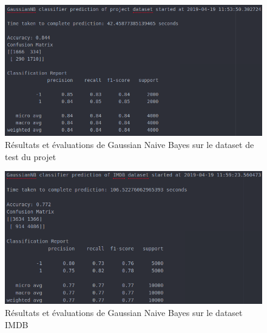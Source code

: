 \documentclass[12pt,a4paper]{report}
\theoremstyle{definition}
\begin{document}
\begin{appendices}
\begin{figure}[!ht]
  \centering
  \includegraphics[scale=0.5]{images/snapshots/predictions/gaussian_naive_bayes/project_dataset_results.png}
  \caption{Résultats et évaluations de Gaussian Naive Bayes sur le dataset de test du projet}
  \label{fig:gnb_project_dataset}
\end{figure}

\begin{figure}[!ht]
  \centering
  \includegraphics[scale=0.5]{images/snapshots/predictions/gaussian_naive_bayes/imdb_dataset_results.png}
  \caption{Résultats et évaluations de Gaussian Naive Bayes sur le dataset IMDB}
  \label{fig:gnb_imdb_dataset}
\end{figure}

\end{appendices}
\end{document}
